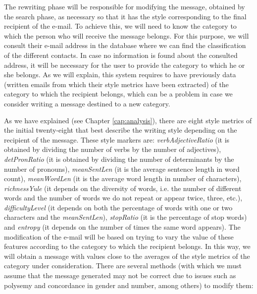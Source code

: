 The rewriting phase will be responsible for modifying the message, obtained by the search phase, as necessary so that it has the style corresponding to the final recipient of the e-mail. To achieve this, we will need to know the category to which the person who will receive the message belongs. For this purpose, we will consult their e-mail address in the database where we can find the classification of the different contacts. In case no information is found about the consulted address, it will be necessary for the user to provide the category to which he or she belongs. As we will explain, this system requires to have previously data (written emails from which their style metrics have been extracted) of the category to which the recipient belongs, which can be a problem in case we consider writing a message destined to a new category.

As we have explained (see Chapter \ref{cap:analysis}), there are eight style metrics of the initial twenty-eight that best describe the writing style depending on the recipient of the message. These style markers are: \textit{verbAdjectiveRatio} (it is obtained by dividing the number of verbs by the number of adjectives), \textit{detPronRatio} (it is obtained by dividing the number of determinants by the number of pronouns), \textit{meanSentLen} (it is the average sentence length in word count), \textit{meanWordLen} (it is the average word length in number of characters), \textit{richnessYule} (it depends on the diversity of words, i.e. the number of different words and the number of words we do not repeat or appear twice, three, etc.), \textit{difficultyLevel} (it depends on both the percentage of words with one or two characters and the \textit{meanSentLen}), \textit{stopRatio} (it is the percentage of stop words) and \textit{entropy} (it depends on the number of times the same word appears). The modification of the e-mail will be based on trying to vary the value of these features according to the category to which the recipient belongs. In this way, we will obtain a message with values close to the averages of the style metrics of the category under consideration. There are several methods (with which we must assume that the message generated may not be correct due to issues such as polysemy and concordance in gender and number, among others) to modify them:

